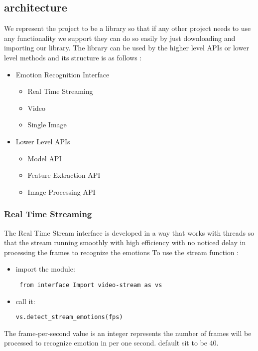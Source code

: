 \subsection{architecture}
    We represent the project to be a library so that if any other project needs to use any functionality we support they can do so easily by just downloading and importing our library.
\bigbreak
    The library can be used by the higher level APIs or 
    lower level methods and its structure is as follows :
        \begin{itemize}
             \item Emotion Recognition Interface 
                \begin{itemize}
                    \item Real Time Streaming
                    \item Video
                    \item Single Image
                \end{itemize}
             \item Lower Level APIs
                \begin{itemize}
                    \item Model API
                    \item Feature Extraction API
                    \item Image Processing API
                \end{itemize}
        \end{itemize}
\newpage

\subsubsection{Real Time Streaming}
The Real Time Stream interface is developed in a way that works with threads so that the stream running smoothly with high efficiency with no noticed delay in processing the frames to recognize the emotions 
\bigbreak 
\noindent To use the stream function :
\begin{itemize}
\item import the module:
\begin{verbatim}
 from interface Import video-stream as vs
\end{verbatim}
\item call it:
\begin{verbatim}
vs.detect_stream_emotions(fps)
\end{verbatim}
\end{itemize}
The frame-per-second value is an integer represents the number of frames will be processed to recognize emotion in per one second. default sit to be 40.
\bigbreak

